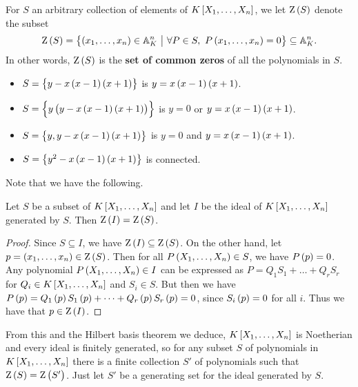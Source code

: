 For $ S $ an arbitrary collection of elements of $ K\sbr{X_1, \dots, X_n} $, we let $ \Z\br{S} $ denote the subset
$$ \Z\br{S} = \cbr{\br{x_1, \dots, x_n} \in \AA_K^n \st \forall P \in S, \ P\br{x_1, \dots, x_n} = 0} \subseteq \AA_K^n. $$
In other words, $ \Z\br{S} $ is the \textbf{set of common zeros} of all the polynomials in $ S $.

\begin{example*}
\hfill
\begin{itemize}
\item $ S = \cbr{y - x\br{x - 1}\br{x + 1}} $ is $ y = x\br{x - 1}\br{x + 1} $.
\item $ S = \cbr{y\br{y - x\br{x - 1}\br{x + 1}}} $ is $ y = 0 $ or $ y = x\br{x - 1}\br{x + 1} $.
\item $ S = \cbr{y, y - x\br{x - 1}\br{x + 1}} $ is $ y = 0 $ and $ y = x\br{x - 1}\br{x + 1} $.
\item $ S = \cbr{y^2 - x\br{x - 1}\br{x + 1}} $ is connected.
\end{itemize}
\end{example*}

\pagebreak

Note that we have the following.

\begin{lemma}
Let $ S $ be a subset of $ K\sbr{X_1, \dots, X_n} $ and let $ I $ be the ideal of $ K\sbr{X_1, \dots, X_n} $ generated by $ S $. Then $ \Z\br{I} = \Z\br{S} $.
\end{lemma}

\begin{proof}
Since $ S \subseteq I $, we have $ \Z\br{I} \subseteq \Z\br{S} $. On the other hand, let $ p = \br{x_1, \dots, x_n} \in \Z\br{S} $. Then for all $ P\br{X_1, \dots, X_n} \in S $, we have $ P\br{p} = 0 $. Any polynomial $ P\br{X_1, \dots, X_n} \in I $ can be expressed as $ P = Q_1S_1 + \dots + Q_rS_r $ for $ Q_i \in K\sbr{X_1, \dots, X_n} $ and $ S_i \in S $. But then we have $ P\br{p} = Q_1\br{p}S_1\br{p} + \dots + Q_r\br{p}S_r\br{p} = 0 $, since $ S_i\br{p} = 0 $ for all $ i $. Thus we have that $ p \in \Z\br{I} $.
\end{proof}

From this and the Hilbert basis theorem we deduce, $ K\sbr{X_1, \dots, X_n} $ is Noetherian and every ideal is finitely generated, so for any subset $ S $ of polynomials in $ K\sbr{X_1, \dots, X_n} $ there is a finite collection $ S' $ of polynomials such that $ \Z\br{S} = \Z\br{S'} $. Just let $ S' $ be a generating set for the ideal generated by $ S $.

